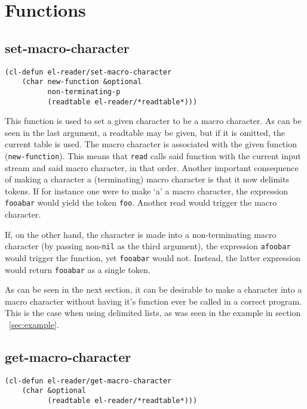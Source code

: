 \documentclass[a4paper,10pt,twoside]{report}
\newcommand{\sym}[1]{\texttt{#1}}
\newcommand{\fun}[1]{\texttt{#1}}
\newcommand{\Read}{\fun{read}}
\newcommand{\nil}{\sym{nil}}
\begin{document}
\section{Functions}
\label{subsec:functions}

\subsection{set-macro-character}
\label{subsec:set-macro-character}

\begin{lstlisting}[style=lispinline]
(cl-defun el-reader/set-macro-character
    (char new-function &optional
          non-terminating-p
          (readtable el-reader/*readtable*)))
\end{lstlisting}

This function is used to set a given character to be a macro character.  As can
be seen in the last argument, a readtable may be given, but if it is omitted,
the current table is used.  The macro character is associated with the given
function (\fun{new-function}).  This means that \Read{} calls said function with
the current input stream and said macro character, in that order.  Another
important consequence of making a character a (terminating) macro character is
that it now delimits tokens.  If for instance one were to make `a' a macro
character, the expression \texttt{fooabar} would yield the token \texttt{foo}.
Another read would trigger the macro character.

If, on the other hand, the character is made into a non-terminating macro
character (by passing non-\nil{} as the third argument), the expression
\texttt{afoobar} would trigger the function, yet \texttt{fooabar} would not.
Instead, the latter expression would return \texttt{fooabar} as a single token.

As can be seen in the next section, it can be desirable to make a character into
a macro character without having it’s function ever be called in a correct
program.  This is the case when using delimited lists, as was seen in the
example in section ~\ref{sec:example}.

\subsection{get-macro-character}
\label{subsec:get-macro-character}

\begin{lstlisting}[style=lispinline]
(cl-defun el-reader/get-macro-character
    (char &optional
          (readtable el-reader/*readtable*)))
\end{lstlisting}
\end{document}

